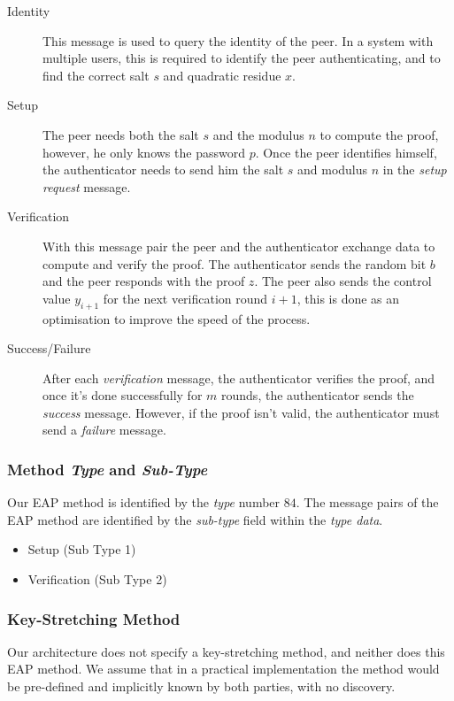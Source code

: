 \newpage
\begin{description}
	\item [Identity] This message is used to query the identity of the peer. In a system with multiple users, this is required to identify the peer authenticating, and to find the correct salt $s$ and quadratic residue $x$.
	\item [Setup] The peer needs both the salt $s$ and the modulus $n$ to compute the proof, however, he only knows the password $p$. Once the peer identifies himself, the authenticator needs to send him the salt $s$ and modulus $n$ in the \textit{setup request} message.
	\item [Verification] With this message pair the peer and the authenticator exchange data to compute and verify the proof. The authenticator sends the random bit $b$ and the peer responds with the proof $z$. The peer also sends the control value $y_{i+1}$ for the next verification round $i+1$, this is done as an optimisation to improve the speed of the process.
	\item [Success/Failure] After each \textit{verification} message, the authenticator verifies the proof, and once it's done successfully for $m$ rounds, the authenticator sends the \textit{success} message. However, if the proof isn't valid, the authenticator must send a \textit{failure} message.
\end{description}

\subsubsection{Method \textit{Type} and \textit{Sub-Type}}
Our EAP method is identified by the \textit{type} number $84$.
The message pairs of the EAP method are identified by the \textit{sub-type} field within the \textit{type data}.
\begin{itemize}
	\item Setup (Sub Type 1)
	\item Verification (Sub Type 2)
\end{itemize}

\subsubsection{Key-Stretching Method}
Our architecture does not specify a key-stretching method, and neither does this EAP method.
We assume that in a practical implementation the method would be pre-defined and implicitly known by both parties, with no discovery.

